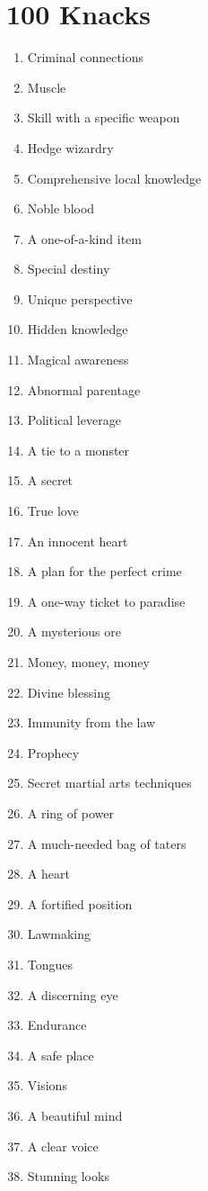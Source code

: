 \section{100 Knacks}
\begin{enumerate}
\item Criminal connections
\item Muscle
\item Skill with a specific weapon
\item Hedge wizardry
\item Comprehensive local knowledge
\item Noble blood
\item A one-of-a-kind item
\item Special destiny
\item Unique perspective
\item Hidden knowledge
\item Magical awareness
\item Abnormal parentage
\item Political leverage
\item A tie to a monster
\item A secret
\item True love
\item An innocent heart
\item A plan for the perfect crime
\item A one-way ticket to paradise
\item A mysterious ore
\item Money, money, money
\item Divine blessing
\item Immunity from the law
\item Prophecy
\item Secret martial arts techniques
\item A ring of power
\item A much-needed bag of taters
\item A heart
\item A fortified position
\item Lawmaking
\item Tongues
\item A discerning eye
\item Endurance
\item A safe place
\item Visions
\item A beautiful mind
\item A clear voice
\item Stunning looks

\end{enumerate}
